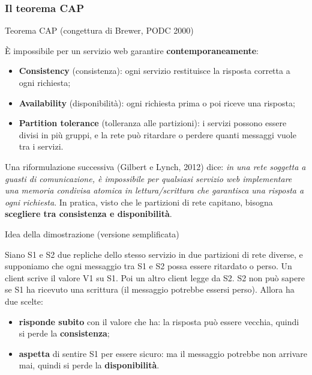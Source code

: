 \subsubsection{Il teorema CAP}\label{il-teorema-cap}

\begin{boxtheorem}{Teorema CAP (congettura di Brewer, PODC 2000)}

È impossibile per un servizio web garantire \textbf{contemporaneamente}:

\begin{itemize}
\tightlist
\item
  \textbf{Consistency} (consistenza): ogni servizio restituisce la
  risposta corretta a ogni richiesta;
\item
  \textbf{Availability} (disponibilità): ogni richiesta prima o poi
  riceve una risposta;
\item
  \textbf{Partition tolerance} (tolleranza alle partizioni): i servizi
  possono essere divisi in più gruppi, e la rete può ritardare o perdere
  quanti messaggi vuole tra i servizi.
\end{itemize}

\end{boxtheorem}

Una riformulazione successiva (Gilbert e Lynch, 2012) dice: \emph{in una
rete soggetta a guasti di comunicazione, è impossibile per qualsiasi
servizio web implementare una memoria condivisa atomica in
lettura/scrittura che garantisca una risposta a ogni richiesta}. In
pratica, visto che le partizioni di rete capitano, bisogna
\textbf{scegliere tra consistenza e disponibilità}.

\begin{boxtip}{Idea della dimostrazione (versione semplificata)}

Siano S1 e S2 due repliche dello stesso servizio in due partizioni di
rete diverse, e supponiamo che ogni messaggio tra S1 e S2 possa essere
ritardato o perso. Un client scrive il valore V1 su S1. Poi un altro
client legge da S2. S2 non può sapere se S1 ha ricevuto una scrittura
(il messaggio potrebbe essersi perso). Allora ha due scelte:

\begin{itemize}
\tightlist
\item
  \textbf{risponde subito} con il valore che ha: la risposta può essere
  vecchia, quindi si perde la \textbf{consistenza};
\item
  \textbf{aspetta} di sentire S1 per essere sicuro: ma il messaggio
  potrebbe non arrivare mai, quindi si perde la \textbf{disponibilità}.
\end{itemize}

\end{boxtip}

